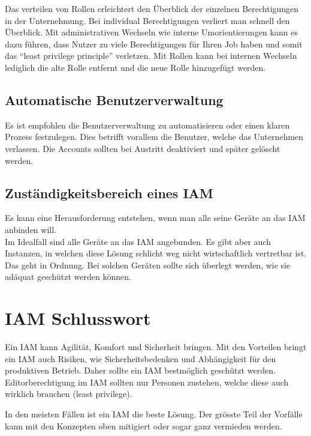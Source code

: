 Das verteilen von Rollen erleichtert den Überblick der einzelnen Berechtigungen in der Unternehmung.
Bei individual Berechtigungen verliert man schnell den Überblick.
Mit administrativen Wechseln wie interne Umorientierungen kann es dazu führen, dass Nutzer zu viele Berechtigungen für Ihren Job haben und somit das ``least privilege principle'' verletzen.
Mit Rollen kann bei internen Wechseln lediglich die alte Rolle entfernt und die neue Rolle hinzugefügt werden.


\subsection{Automatische Benutzerverwaltung}
Es ist empfohlen die Benutzerverwaltung zu automatisieren oder einen klaren Prozess festzulegen.
Dies betrifft vorallem die Benutzer, welche das Unternehmen verlassen.
Die Accounts sollten bei Austritt deaktiviert und später gelöscht werden.


\subsection{Zuständigkeitsbereich eines IAM}
Es kann eine Herausforderung entstehen, wenn man alle seine Geräte an das IAM anbinden will.\\

Im Idealfall sind alle Geräte an das IAM angebunden.
Es gibt aber auch Instanzen, in welchen diese Lösung schlicht weg nicht wirtschaftlich vertretbar ist.
Das geht in Ordnung.
Bei solchen Geräten sollte sich überlegt werden, wie sie adäquat geschützt werden können.

\section{IAM Schlusswort}
Ein IAM kann Agilität, Komfort und Sicherheit bringen.
Mit den Vorteilen bringt ein IAM auch Risiken, wie Sicherheitsbedenken und Abhängigkeit für den produktiven Betrieb.
Daher sollte ein IAM bestmöglich geschützt werden.
Editorberechtigung im IAM sollten nur Personen zustehen, welche diese auch wirklich brauchen (least privilege).

In den meisten Fällen ist ein IAM die beste Lösung.
Der grösste Teil der Vorfälle kann mit den Konzepten oben mitigiert oder sogar ganz vermieden werden.
